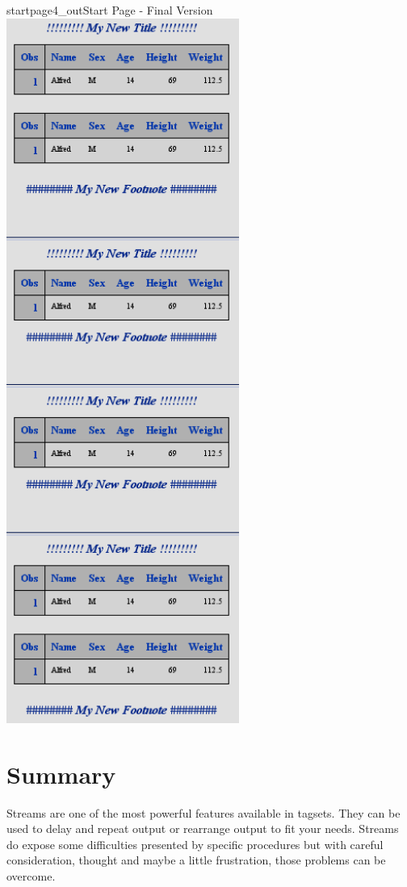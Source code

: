 \begin{goutput}{startpage4_out}{Start Page - Final Version}
\includegraphics[width=3in]{startpage4.png}
\end{goutput}


\section{Summary}
Streams are one of the most powerful features available in tagsets.
They can be used to delay and repeat output or rearrange output to
fit your needs.  Streams do expose some difficulties presented by 
specific procedures but with careful consideration, thought and 
maybe a little frustration, those problems can be overcome.

